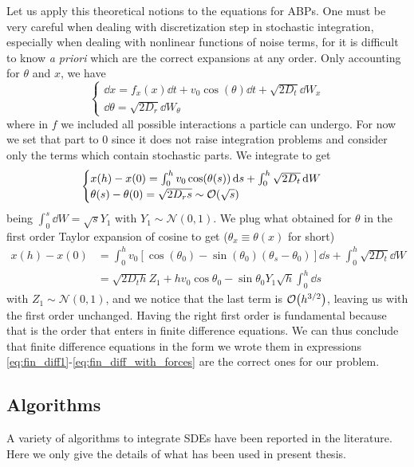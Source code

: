 \documentclass[../../master_thesis_np.tex]{subfiles}
\begin{document}
		Let us apply this theoretical notions to the equations for ABPs. 
		One must be very careful when dealing with discretization step in stochastic integration, especially when dealing with nonlinear functions of noise terms, for it is difficult to know \emph{a priori} which are the correct expansions at any order. 
		Only accounting for $\theta$ and $x$, we have
		\begin{equation} 
			\begin{cases}
			\dd{x} = f_x(x)\dd{t} + v_0\cos(\theta)\dd{t} + \sqrt{2D_t}\dd{W_x} \\
			\dd{\theta} = \sqrt{2D_r}\dd{W_\theta}
			\end{cases} 
		\end{equation} 
		where in $f$ we included all possible interactions a particle can undergo. 
		For now we set that part to 0 since it does not raise integration problems and consider only the terms which contain stochastic parts. 
		We integrate to get
		\begin{equation}
			\begin{cases}
				x(h) - x(0) =  \int_{0}^{h}v_0 \cos(\theta(s)) \dd{s} + \int_{0}^{h} \sqrt{2D_t}\dd{W} \\
			\theta(s) - \theta(0) = \sqrt{2D_r s} \sim \order{\sqrt{s}}
		    \end{cases}  
	    \end{equation}
		being $\int_{0}^{s}\dd{W} = \sqrt{s} Y_1$ with $Y_1 \sim \mathcal{N}(0,1)$. 
		We plug what obtained for $\theta$ in the first order Taylor expansion of cosine to get ($\theta_x \equiv \theta(x)$ for short)
		\begin{align} 
			x(h) - x(0) &=  \int_{0}^{h}v_0 \left[\cos(\theta_0) - \sin(\theta_0)(\theta_s-\theta_0)\right]\dd{s} + \int_{0}^{h} \sqrt{2D_t}\dd{W}  \\
			& = \sqrt{2D_th} Z_1 + hv_0 \cos\theta_0 - \sin \theta_0 Y_1 \sqrt{h} \int_{0}^{h}\dd{s}
	    \end{align}
	    with $Z_1 \sim \mathcal{N}(0,1)$, and we notice that the last term is $\order{h^{3/2}}$, leaving us with the first order unchanged. 
	    Having the right first order is fundamental because that is the order that enters in finite difference equations. 
	    We can thus conclude that finite difference equations in the form we wrote them in expressions \ref{eq:fin_diff1}-\ref{eq:fin_diff_with_forces} are the correct ones for our problem.
	    
		\subsection{Algorithms}
		A variety of algorithms to integrate SDEs have been reported in the literature. 
		Here we only give the details of what has been used in present thesis.
		
\end{document}
